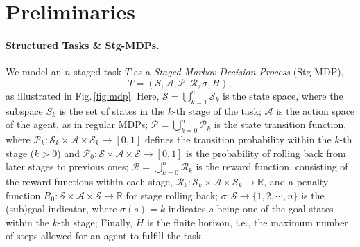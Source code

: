 \documentclass{article}
\begin{document}
\begin{table}[h]
\centering
{}
\caption{Methods Comparison in Policy, Representation Optimization, and Granularity}
\label{tab:comparison}
\end{table}


\section{Preliminaries}

\paragraph{Structured Tasks \& Stg-MDPs.} We model an $n$-staged task $T$ as a \emph{Staged Markov Decision Process} (Stg-MDP),
\[
T=\left(\mathcal{S},\mathcal{A},\mathcal{P},\mathcal{R},\sigma,H\right),
\]
as illustrated in Fig.\,\ref{fig:mdp}.
Here, $\mathcal{S}=\bigcup_{k=1}^n\mathcal{S}_k$ is the state space, where the subspace $S_k$ is the set of states in the $k$-th stage of the task;
$\mathcal{A}$ is the action space of the agent, as in regular MDPs;
$\mathcal{P}=\bigcup_{k=0}^n\mathcal{P}_k$ is the state transition function, where $\mathcal{P}_k:\mathcal{S}_k\times\mathcal{A}\times\mathcal{S}_k\rightarrow[0,1]$ defines the transition probability within the $k$-th stage ($k>0$) and $\mathcal{P}_0:\mathcal{S}\times\mathcal{A}\times\mathcal{S}\rightarrow[0,1]$ is the probability of rolling back from later stages to previous ones;
$\mathcal{R}=\bigcup_{k=0}^n\mathcal{R}_k$ is the reward function, consisting of the reward functions within each stage, $\mathcal{R}_k:\mathcal{S}_k\times\mathcal{A}\times\mathcal{S}_k\rightarrow\mathbb{R}$, and a penalty function $R_0:\mathcal{S}\times\mathcal{A}\times\mathcal{S}\rightarrow\mathbb{R}$ for stage rolling back;
$\sigma:\mathcal{S}\rightarrow\{1,2,\cdots,n\}$ is the (sub)goal indicator, where $\sigma(s)=k$ indicates $s$ being one of the goal states within the $k$-th stage;
Finally, $H$ is the finite horizon, i.e., the maximum number of steps allowed for an agent to fulfill the task.
\end{document}
